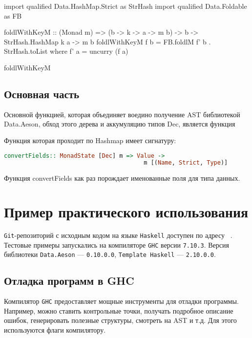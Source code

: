 \begin{ListingEnv}[H]
\begin{Verb}
import qualified Data.HashMap.Strict as StrHash
import qualified Data.Foldable    as FB

foldlWithKeyM :: (Monad m) => (b -> k -> a -> m b) -> b ->
                                       StrHash.HashMap k a -> m b
foldlWithKeyM f b = FB.foldlM f' b . StrHash.toList
  where f' a = uncurry (f a)
\end{Verb}
\caption{foldlWithKeyM}
\label{listing:foldMonad}
\end{ListingEnv} 

\section{Основная часть}

Основной функцией, которая объединяет воедино получение AST библиотекой Data.Aeson, обход этого дерева и аккумуляцию типов Dec, является функция 

Функция которая проходит по Hashmap имеет сигнатуру:

\begin{lstlisting}[language=Haskell]
convertFields:: MonadState [Dec] m => Value -> 
                                        m [(Name, Strict, Type)]
\end{lstlisting}

Функция convertFields как раз порождает именованные поля для типа данных.

\chapter{Пример практического использования}

\lstinline{Git}-репозиторий с исходным кодом на языке \lstinline{Haskell} доступен по адресу ~\cite{diploma}. Тестовые примеры запускались на компиляторе \lstinline{GHC} версии \lstinline{7.10.3}. Версия библиотеки \lstinline{Data.Aeson} --- \lstinline{0.10.0.0}, \lstinline{Template Haskell} --- \lstinline{2.10.0.0}.

\section{Отладка программ в GHC}

Компилятор \lstinline{GHC} предоставляет мощные инструменты для отладки программы. ~\cite{debugGHC} Например, можно ставить контрольные точки, получать подробное описание ошибок, генерировать полезные структуры, смотреть на AST и т.д. Для этого используются флаги компилятору. 

